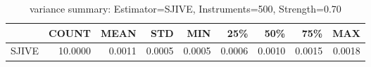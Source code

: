 \begin{table}[ht]
\centering
\caption{variance summary: Estimator=SJIVE, Instruments=500, Strength=0.70}
\begin{tabular}{lrrrrrrrr}
\toprule
 & COUNT & MEAN & STD & MIN & 25\% & 50\% & 75\% & MAX \\
\midrule
SJIVE & 10.0000 & 0.0011 & 0.0005 & 0.0005 & 0.0006 & 0.0010 & 0.0015 & 0.0018 \\
\bottomrule
\end{tabular}
\end{table}
